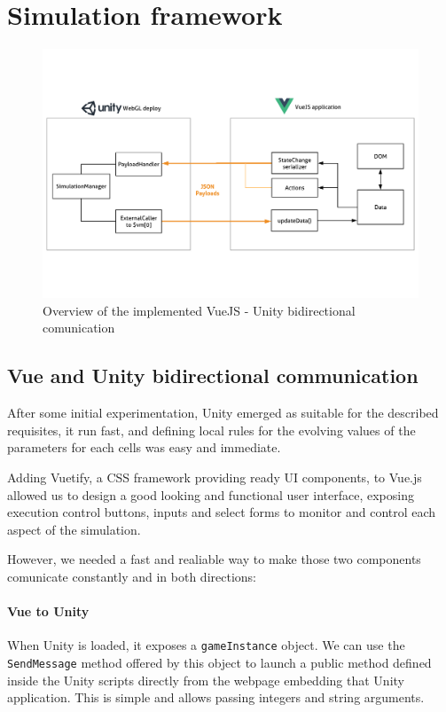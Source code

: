 \section{Simulation framework}
\begin{figure}
  \centering
    \includegraphics[width=1\textwidth]{sw_arch}%
    
  \caption{Overview of the implemented VueJS - Unity bidirectional comunication}
  \label{fig:swstack1}
\end{figure}
\subsection{Vue and Unity bidirectional communication}
After some initial experimentation, Unity emerged as suitable for the described requisites, it run fast, and defining local rules for the evolving values of the parameters for each cells was easy and immediate.

Adding Vuetify, a CSS framework providing ready UI components, to Vue.js allowed us to design a good looking and functional user interface, exposing execution control buttons, inputs and select forms to monitor and control each aspect of the simulation.

However, we needed a fast and realiable way to make those two components comunicate constantly and in both directions:

\paragraph{Vue to Unity}

When Unity is loaded, it exposes a \texttt{gameInstance} object. We can use the \texttt{SendMessage} method offered by this object to launch a public method defined inside the Unity scripts directly from the webpage embedding that Unity application. This is simple and allows passing integers and string arguments.

